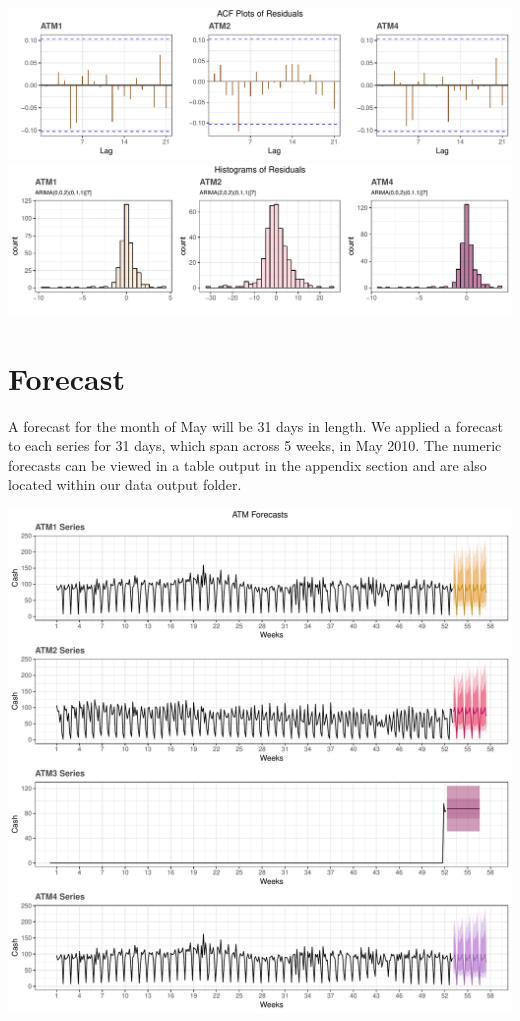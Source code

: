 \documentclass[openany]{book}
\begin{document}
\includegraphics{Group2_Project1_Fall2019_files/figure-latex/unnamed-chunk-7-1.pdf}
\includegraphics{Group2_Project1_Fall2019_files/figure-latex/unnamed-chunk-7-2.pdf}

\hypertarget{forecast}{%
\section{Forecast}\label{forecast}}

A forecast for the month of May will be 31 days in length. We applied a
forecast to each series for 31 days, which span across 5 weeks, in May
2010. The numeric forecasts can be viewed in a table output in the
appendix section and are also located within our data output folder.

\includegraphics{Group2_Project1_Fall2019_files/figure-latex/unnamed-chunk-8-1.pdf}
\end{document}
